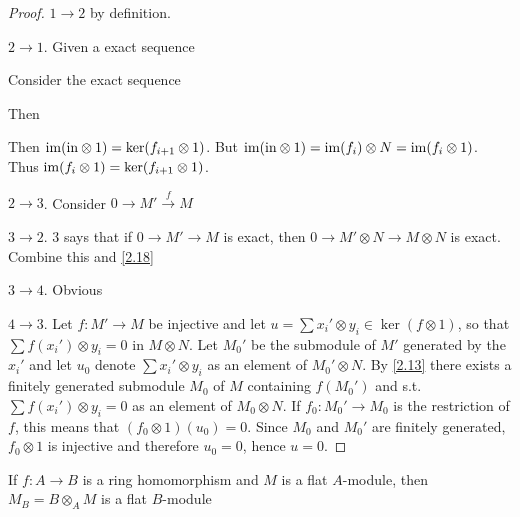 \documentclass[11pt]{article}
\begin{document}
\begin{proof}
\(1\to 2\) by definition.

\(2\to 1\). Given a exact sequence
\begin{center}\end{center}
Consider the exact sequence
\begin{center}\end{center}
Then
\begin{center}\end{center}
Then \(\operatorname{im}(\text{in}\otimes 1)=\ker(f_{i+1}\otimes 1)\). But \(\operatorname{im}(\text{in}\otimes 1)=\operatorname{im}(f_i)\otimes N=\operatorname{im}(f_i\otimes 1)\).
Thus \(\operatorname{im}(f_i\otimes 1)=\ker(f_{i+1}\otimes 1)\).

\(2\to 3\). Consider \(0\to M'\xrightarrow{f}M\)

\(3\to 2\). 3 says that if \(0\to M'\to M\) is exact, then \(0\to M'\otimes N\to M\otimes N\) is exact. Combine this
and \ref{2.18}

\(3\to 4\). Obvious

\(4\to 3\). Let \(f:M'\to M\) be injective and let \(u=\sum x_i'\otimes y_i\in\ker(f\otimes 1)\), so
that \(\sum f(x_i')\otimes y_i=0\) in \(M\otimes N\). Let \(M_0'\) be the submodule of \(M'\) generated by
the \(x_i'\) and let \(u_0\) denote \(\sum x_i'\otimes y_i\) as an element of \(M_0'\otimes N\). By \ref{2.13} there
exists a finitely generated submodule \(M_0\) of \(M\) containing \(f(M_0')\) and
s.t. \(\sum f(x_i')\otimes y_i=0\) as an element of \(M_0\otimes N\). If \(f_0:M_0'\to M_0\) is the restriction
of \(f\), this means that \((f_0\otimes 1)(u_0)=0\). Since \(M_0\) and \(M_0'\) are finitely
generated, \(f_0\otimes 1\) is injective and therefore \(u_0=0\), hence \(u=0\).
\end{proof}

\begin{exercise}
If \(f:A\to B\) is a ring homomorphism and \(M\) is a flat \(A\)-module, then \(M_B=B\otimes_AM\) is a
flat \(B\)-module
\end{exercise}
\end{document}
